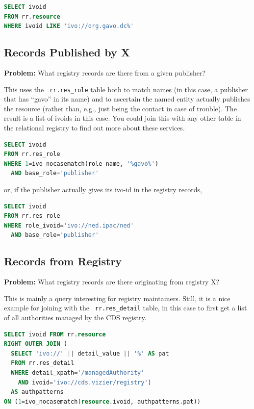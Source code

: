 \documentclass[11pt,a4paper]{ivoa}
\newcommand{\rtent}[1]{\texttt{\color{rtcolor} #1}}
\begin{document}
\begin{lstlisting}[language=SQL,flexiblecolumns=true]
SELECT ivoid 
FROM rr.resource
WHERE ivoid LIKE 'ivo://org.gavo.dc%'
\end{lstlisting}

\subsection{Records Published by X}

\textbf{Problem:} What registry records are there from a given
publisher?

This uses the 
\rtent{rr.res\_role}
 table both to
match names (in this case, a publisher that has ``gavo'' in its name) and
to ascertain the named entity actually publishes the resource (rather
than, e.g., just being the contact in case of trouble).  The result is a
list of ivoids in this case.  You could join this with any other
table in the relational registry to find out more about these
services.


\begin{lstlisting}[language=SQL,flexiblecolumns=true]
SELECT ivoid 
FROM rr.res_role
WHERE 1=ivo_nocasematch(role_name, '%gavo%')
  AND base_role='publisher'
\end{lstlisting}

or, if the publisher actually gives its ivo-id in the registry
records,


\begin{lstlisting}[language=SQL,flexiblecolumns=true]
SELECT ivoid 
FROM rr.res_role
WHERE role_ivoid='ivo://ned.ipac/ned'
  AND base_role='publisher'
\end{lstlisting}

\subsection{Records from Registry}

\textbf{Problem:} What registry records are
there originating from registry X?

This is mainly a query interesting for registry maintainers.  Still,
it is a nice example for joining with the
\rtent{rr.res\_detail} table, in this case to
first get a list of all authorities managed by the CDS registry.


\begin{lstlisting}[language=SQL,flexiblecolumns=true]
SELECT ivoid FROM rr.resource
RIGHT OUTER JOIN (
  SELECT 'ivo://' || detail_value || '%' AS pat
  FROM rr.res_detail
  WHERE detail_xpath='/managedAuthority' 
    AND ivoid='ivo://cds.vizier/registry') 
  AS authpatterns
ON (1=ivo_nocasematch(resource.ivoid, authpatterns.pat))
\end{lstlisting}
\end{document}
